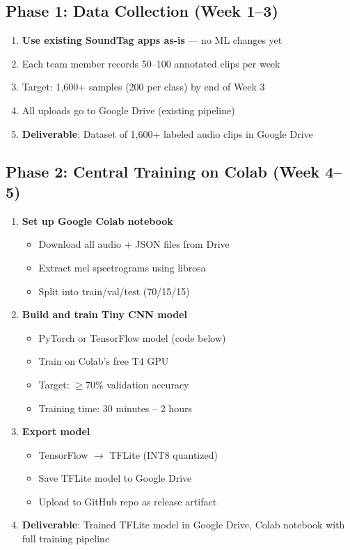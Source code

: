 \documentclass[11pt,a4paper]{article}
\begin{document}
\subsection{Phase 1: Data Collection (Week 1--3)}

\begin{enumerate}[leftmargin=*,noitemsep]
    \item \textbf{Use existing SoundTag apps as-is} — no ML changes yet
    \item Each team member records 50--100 annotated clips per week
    \item Target: 1,600+ samples (200 per class) by end of Week 3
    \item All uploads go to Google Drive (existing pipeline)
    \item \textbf{Deliverable}: Dataset of 1,600+ labeled audio clips in Google Drive
\end{enumerate}

\subsection{Phase 2: Central Training on Colab (Week 4--5)}

\begin{enumerate}[leftmargin=*,noitemsep]
    \item \textbf{Set up Google Colab notebook}
    \begin{itemize}[leftmargin=*,noitemsep]
        \item Download all audio + JSON files from Drive
        \item Extract mel spectrograms using librosa
        \item Split into train/val/test (70/15/15)
    \end{itemize}
    
    \item \textbf{Build and train Tiny CNN model}
    \begin{itemize}[leftmargin=*,noitemsep]
        \item PyTorch or TensorFlow model (code below)
        \item Train on Colab's free T4 GPU
        \item Target: $\geq$70\% validation accuracy
        \item Training time: 30 minutes -- 2 hours
    \end{itemize}
    
    \item \textbf{Export model}
    \begin{itemize}[leftmargin=*,noitemsep]
        \item TensorFlow $\rightarrow$ TFLite (INT8 quantized)
        \item Save TFLite model to Google Drive
        \item Upload to GitHub repo as release artifact
    \end{itemize}
    
    \item \textbf{Deliverable}: Trained TFLite model in Google Drive, Colab notebook with full training pipeline
\end{enumerate}
\end{document}

